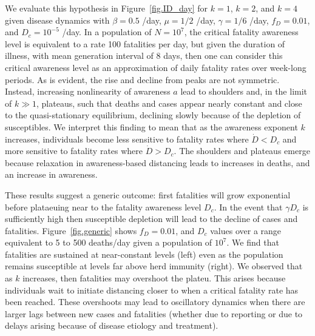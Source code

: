 We evaluate this hypothesis in
Figure~\ref{fig.ID_day} for $k=1$, $k=2$, and $k=4$
given disease dynamics with $\beta=0.5$ /day, $\mu=1/2$ /day, $\gamma=1/6$
/day,
$f_D=0.01$, and $D_c=10^{-5}$ /day.  In a population of $N=10^7$, the
critical fatality awareness level is equivalent to a rate 100 fatalities
per day, but given the duration of illness, with mean generation
interval of 8 days, then one can consider this critical awareness
level as an approximation of daily fatality rates over week-long periods.
As is evident, the rise and decline from peaks are not symmetric. Instead,
increasing nonlinearity of awareness
$a$ lead to shoulders and, in the limit of $k\gg 1$, plateaus, such that
deaths and cases appear nearly constant and close to the quasi-stationary
equilibrium, declining slowly because of the
depletion of susceptibles.  
We interpret this finding to mean that as the awareness exponent $k$ increases,
individuals become less sensitive to fatality rates
where $\dot{D} < D_c$ and more sensitive to fatality rates where $\dot{D} > D_c$.  
The shoulders and plateaus emerge because relaxation in awareness-based
distancing leads to increases in deaths, and an increase in awareness.

These results suggest a generic outcome: first fatalities will grow
exponential before plataeuing near to the fatality awareness level $D_c$.
In the event that $\gamma D_c$ is sufficiently high then susceptible
depletion will lead to the decline of cases and fatalities.
Figure~\ref{fig.generic} shows
$f_D=0.01$, and $D_c$ values over a range 
equivalent to 5 to 500 deaths/day given a population of $10^7$.
We find that fatalities are sustained at near-constant levels (left)
even as the population remains susceptible at levels far above herd immunity (right).
We observed that as $k$ increases, then fatalities may overshoot
the plateu. This arises because individuals wait to initiate distancing
closer to when a critical fatality rate has been reached.
These overshoots may lead to oscillatory dynamics
when there are larger lags between new cases and fatalities
(whether due to reporting or due to delays arising because of disease
etiology and treatment).

